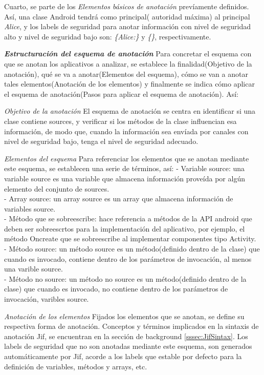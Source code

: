 Cuarto, se parte de los \textit{Elementos básicos de anotación} prevíamente
definidos. Así, una clase Android tendrá como principal( autoridad máxima) al
principal \emph{Alice}, y los labels de seguridad para anotar información con
nivel de seguridad alto y nivel de seguridad bajo son: \emph{\{Alice:\}} y
\emph{\{\}}, respectivamente.

\textbf{\textit{Estructuración del esquema de anotación}}\newline 
Para concretar el esquema con que se anotan los aplicativos a analizar, se
establece la finalidad(Objetivo de la anotación), qué se va a anotar(Elementos
del esquema), cómo se van a anotar tales elementos(Anotación de los elementos) y
finalmente se indica cómo aplicar el esquema de anotación(Pasos para aplicar el
esquema de anotación). Así:

\textit{Objetivo de la anotación}\newline
El esquema de anotación se centra en identificar si una clase contiene sources,
y verificar si los métodos de la clase influencian esa información, de modo que,
cuando la información sea envíada por canales con nivel de seguridad bajo, tenga
el nivel de seguridad adecuado.

\textit{Elementos del esquema}\newline
Para referenciar los elementos que se anotan mediante este esquema, se
establecen una serie de términos, así:\newline
- Variable source: una variable source es una variable que almacena
información proveída por algún elemento del conjunto de sources.\\
- Array source: un array source es un array que almacena información de
variables source.\\
- Método que se sobreescribe: hace referencia a métodos de la API android
que deben ser sobreescrtos para la implementación del aplicativo, por ejemplo, el
método Oncreate que se sobreescribe al implementar componentes tipo
Activity.\\
- Método source: un método source es un método(definido dentro de la
clase) que cuando es invocado, contiene dentro de los parámetros de invocación, al menos
una varible source.\\
- Método no source: un método no source es un método(definido dentro de la
clase) que cuando es invocado, no contiene dentro de los parámetros de invocación,
varibles source.

\textit{Anotación de los elementos}\newline
Fijados los elementos que se anotan, se define su respectiva forma de anotación.
Conceptos y términos implicados en la sintaxis de anotación Jif, se
encuentran en la sección de background \ref{sssec:JifSintax}.
Los labels de seguridad que no son anotadas mediante este esquema, son generados
automáticamente por Jif, acorde a los labels que estable por defecto para la
definición de variables, métodos y arrays, etc.

